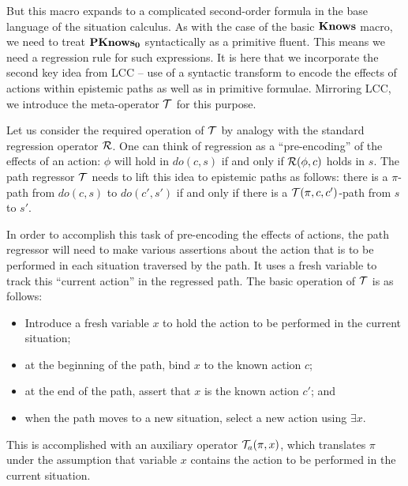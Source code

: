 But this macro expands to a complicated second-order formula in the
base language of the situation calculus. As with the case of the basic
$\mathbf{Knows}$ macro, we need to treat $\mathbf{PKnows_{0}}$ syntactically as a primitive
fluent. This means we need a regression rule for such expressions.
It is here that we incorporate the second key idea from LCC -- use
of a syntactic transform to encode the effects of actions within epistemic
paths as well as in primitive formulae. Mirroring LCC, we introduce
the meta-operator $\mathcal{T}$ for this purpose.

Let us consider the required operation of $\mathcal{T}$ by analogy with
the standard regression operator $\mathcal{R}$. One can think of regression
as a {}``pre-encoding'' of the effects of an action: $\phi$ will
hold in $do(c,s)$ if and only if $\mathcal{R}(\phi,c)$ holds in $s$. The
path regressor $\mathcal{T}$ needs to lift this idea to epistemic paths
as follows: there is a $\pi$-path from $do(c,s)$ to $do(c',s')$
if and only if there is a $\mathcal{T}(\pi,c,c')$-path from $s$ to $s'$.

In order to accomplish this task of pre-encoding the effects of actions,
the path regressor will need to make various assertions about the
action that is to be performed in each situation traversed by the
path. It uses a fresh variable to track this {}``current action''
in the regressed path. The basic operation of $\mathcal{T}$ is as follows:

\begin{itemize}
\item Introduce a fresh variable $x$ to hold the action to be performed
in the current situation; 
\item at the beginning of the path, bind $x$ to the known action $c$; 
\item at the end of the path, assert that $x$ is the known action $c'$;
and 
\item when the path moves to a new situation, select a new action using
$\exists x$. 
\end{itemize}
This is accomplished with an auxiliary operator $\mathcal{T}_{a}(\pi,x)$, which
translates $\pi$ under the assumption that variable $x$ contains
the action to be performed in the current situation.


